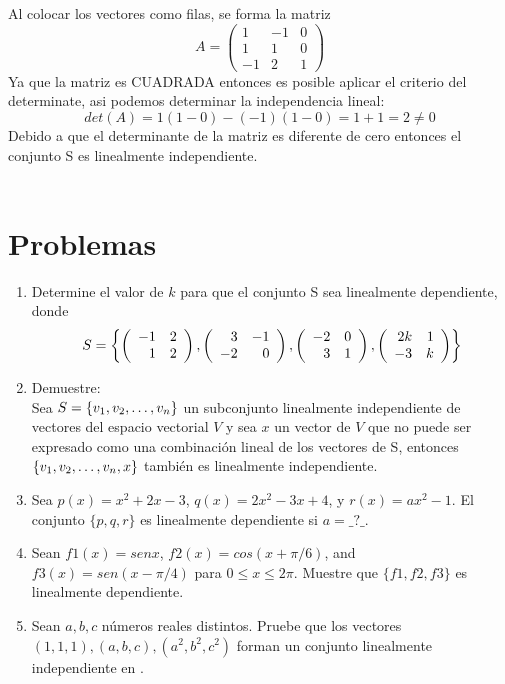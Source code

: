 Al colocar los vectores como filas, se forma la matriz
\[A=
\left(
\begin{array}{rrr}
1&-1&0\\
1&1&0\\
-1&2&1
\end{array}
\right)
\]
Ya que la matriz es CUADRADA entonces es posible aplicar el criterio del determinate, asi podemos determinar la independencia lineal:
\[det(A)=1(1-0)-(-1)(1-0)=1+1=2\neq 0\]
Debido a que el determinante de la matriz es diferente de cero entonces el conjunto S es linealmente independiente.
~\\
~\\



\section{Problemas}
\begin{enumerate}


\item
Determine el valor de $k$ para que el conjunto S sea linealmente dependiente, donde $$S=\left\{ \left( \begin{array}{rr} -1&2\\ 1&2 \end{array} \right) ,  \left( \begin{array}{rr} 3&-1\\ -2&0 \end{array} \right) ,  \left( \begin{array}{rr} -2&0\\ 3&1 \end{array} \right) , \left( \begin{array}{rr} 2k&1\\ -3&k \end{array} \right) \right\}$$

\item
Demuestre:
\\Sea $S= \lbrace v_1, v_2, \ldots, v_n \rbrace$ un subconjunto linealmente independiente de vectores del espacio vectorial $V$ y sea $x$ un vector de $V$ que no puede ser expresado como una combinaci\'on lineal de los vectores de S, entonces $ \left\{ v_1, v_2, \ldots, v_n, x \right\} $
tambi\'en es linealmente independiente.

\item
Sea $p(x)= x^2+2x-3$, $q(x)=2x^2-3x+4$, y $r(x)=ax^2-1$. El conjunto $\{p, q, r\}$ es
linealmente dependiente si $a=\_?\_$.

\item
Sean $f1(x) = sen x$, $f2(x) = cos(x+\pi/6)$, and $f3(x) = sen(x-\pi/4)$ para $0 \leq x \leq 2\pi$. Muestre que 
$\{f1, f2, f3\}$ es linealmente dependiente.


\item
Sean $a, b, c$ números reales distintos. Pruebe que los vectores $(1, 1, 1), (a, b, c), (a^2, b^2, c^2)$ forman un conjunto linealmente independiente en \rtres.

\end{enumerate}

